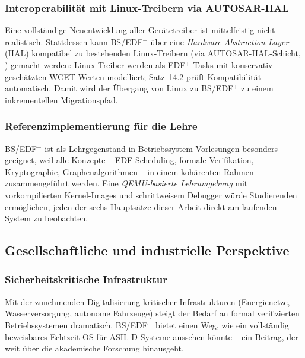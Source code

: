 ﻿\documentclass[a4paper,12pt]{scrreprt}
\theoremstyle{definition}
\begin{document}
	\subsubsection{Interoperabilität mit Linux-Treibern via AUTOSAR-HAL}
	
	Eine vollständige Neuentwicklung aller Gerätetreiber ist
	mittelfristig nicht realistisch. Stattdessen kann BS/EDF$^+$
	über eine \emph{Hardware Abstraction Layer} (HAL) kompatibel
	zu bestehenden Linux-Treibern (via AUTOSAR-HAL-Schicht,
	\cite{Epp2026autsrepy}) gemacht werden: Linux-Treiber werden
	als EDF$^+$-Tasks mit konservativ geschätzten WCET-Werten
	modelliert; Satz~14.2 prüft Kompatibilität automatisch.
	Damit wird der Übergang von Linux zu BS/EDF$^+$ zu einem
	inkrementellen Migrationspfad.
	
	\subsubsection{Referenzimplementierung für die Lehre}
	
	BS/EDF$^+$ ist als Lehrgegenstand in Betriebssystem-Vorlesungen
	besonders geeignet, weil alle Konzepte -- EDF-Scheduling,
	formale Verifikation, Kryptographie, Graphenalgorithmen --
	in einem kohärenten Rahmen zusammengeführt werden.
	Eine \emph{QEMU-basierte Lehrumgebung} mit vorkompilierten
	Kernel-Images und schrittweisem Debugger würde Studierenden
	ermöglichen, jeden der sechs Hauptsätze dieser Arbeit
	direkt am laufenden System zu beobachten.
	
	\subsection{Gesellschaftliche und industrielle Perspektive}
	
	\subsubsection{Sicherheitskritische Infrastruktur}
	
	Mit der zunehmenden Digitalisierung kritischer Infrastrukturen
	(Energienetze, Wasserversorgung, autonome Fahrzeuge) steigt der
	Bedarf an formal verifizierten Betriebssystemen dramatisch.
	BS/EDF$^+$ bietet einen Weg, wie ein vollständig beweisbares
	Echtzeit-OS für ASIL-D-Systeme aussehen könnte -- ein Beitrag,
	der weit über die akademische Forschung hinausgeht.
	
\end{document}
